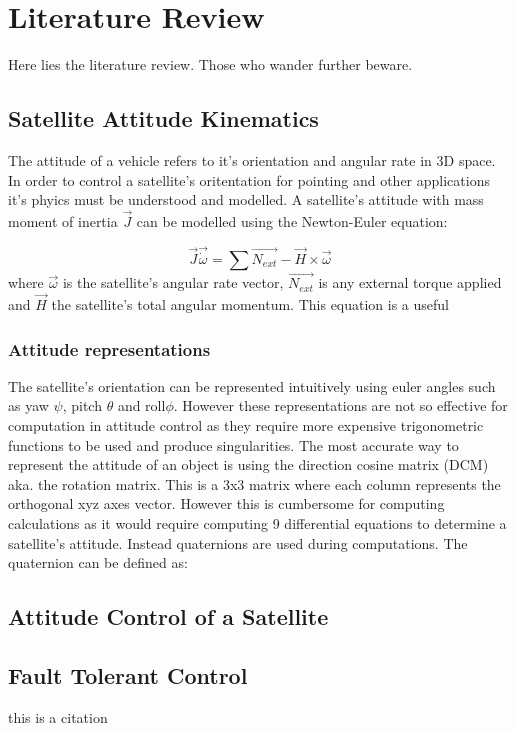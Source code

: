 
\chapter{Literature Review}
\label{chap:literature_review}

Here lies the literature review. Those who wander further beware.

\section{Satellite Attitude Kinematics}

The attitude of a vehicle refers to it's orientation and angular rate in 3D space. In order to control a satellite's
oritentation for pointing and other applications it's phyics must be understood and modelled. 
A satellite's attitude with mass moment of inertia $\vec{J}$ can be modelled using the Newton-Euler equation: 

\begin{equation}
\vec{J}\vec{\dot{\omega}} = \sum{\vec{N_{ext}}} -\vec{H}\times\vec{\omega}
\end{equation}
where $\vec{\omega}$ is the satellite's angular rate vector, $\vec{N_{ext}}$ is any external torque applied and $\vec{H}$
the satellite's total angular momentum. This equation is a useful 

\subsection{Attitude representations}
The satellite's orientation can be represented intuitively using euler angles such as yaw $\psi$, pitch $\theta$ and roll$\phi$.
However these representations are not so effective for computation in attitude control as they require more expensive trigonometric
functions to be used and produce singularities. The most accurate way to represent the attitude of an object is using the direction
cosine matrix (DCM) aka. the rotation matrix. This is a 3x3 matrix where each column represents the orthogonal xyz axes vector. However
this is cumbersome for computing calculations as it would require computing 9 differential equations to determine a satellite's 
attitude. Instead quaternions are used during computations. The quaternion can be defined as:

\section{Attitude Control of a Satellite}

\section{}
\section{Fault Tolerant Control}

this is a citation \cite{caoNovelLearningObserverbased2022} \cite{yinReviewRecentDevelopment2016}
